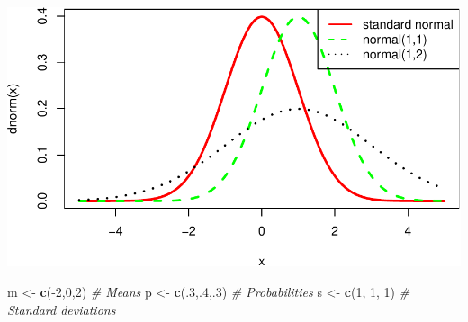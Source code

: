 \documentclass[]{article}
\newenvironment{Shaded}{\begin{snugshade}}{\end{snugshade}}
\newcommand{\KeywordTok}[1]{\textcolor[rgb]{0.13,0.29,0.53}{\textbf{{#1}}}}
\newcommand{\DecValTok}[1]{\textcolor[rgb]{0.00,0.00,0.81}{{#1}}}
\newcommand{\StringTok}[1]{\textcolor[rgb]{0.31,0.60,0.02}{{#1}}}
\newcommand{\CommentTok}[1]{\textcolor[rgb]{0.56,0.35,0.01}{\textit{{#1}}}}
\newcommand{\NormalTok}[1]{{#1}}
\begin{document}
\includegraphics{probability_files/figure-latex/unnamed-chunk-18-2.pdf}

\begin{Shaded}
\begin{Highlighting}[]
\NormalTok{m <-}\StringTok{ }\KeywordTok{c}\NormalTok{(-}\DecValTok{2}\NormalTok{,}\DecValTok{0}\NormalTok{,}\DecValTok{2}\NormalTok{)    }\CommentTok{# Means}
\NormalTok{p <-}\StringTok{ }\KeywordTok{c}\NormalTok{(.}\DecValTok{3}\NormalTok{,.}\DecValTok{4}\NormalTok{,.}\DecValTok{3}\NormalTok{)  }\CommentTok{# Probabilities}
\NormalTok{s <-}\StringTok{ }\KeywordTok{c}\NormalTok{(}\DecValTok{1}\NormalTok{, }\DecValTok{1}\NormalTok{, }\DecValTok{1}\NormalTok{)   }\CommentTok{# Standard deviations}
 

\end{Highlighting}
\end{Shaded}
\end{document}
